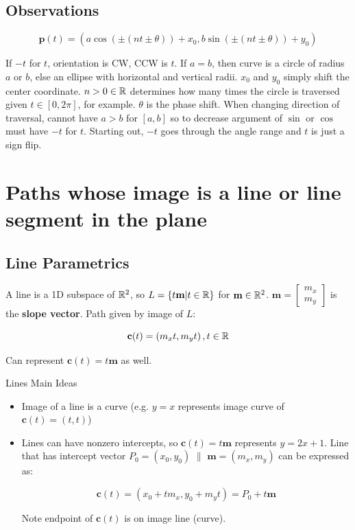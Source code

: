 \subsection{Observations}

\[\boxed{\textbf{p}(t)=(a\cos (\pm (nt \pm\theta)) + x_0, b\sin (\pm (nt \pm \theta)) + y_0)}\]

If $-t$ for $t$, orientation is CW, CCW is $t$. If $a=b$, then curve is 
a circle of radius $a$ or $b$, else an ellipse with horizontal and vertical radii.
$x_0$ and $y_0$ simply shift the center coordinate. $n>0\in \mathbb{R}$ determines how many times
the circle is traversed given $t\in[0,2\pi]$, for example. $\theta$ is the phase shift.
When changing direction of traversal, cannot have $a>b$ for $[a,b]$ so to decrease argument of $\sin$ or $\cos$
must have $-t$ for $t$. Starting out, $-t$ goes through the angle range and $t$ is just a sign flip.

\section{Paths whose image is a line or line segment in the plane}

\subsection{Line Parametrics}

A line is a 1D subspace of $\mathbb{R}^2$, so $L=\{t\textbf{m}|t\in\mathbb{R}\}$ for $\textbf{m}\in\mathbb{R}^2$.
$\textbf{m}=\begin{bmatrix}m_x\\m_y\end{bmatrix}$ is the \textbf{slope vector}.
Path given by image of $L$: 

\[\textbf{c}(t)=\left(m_{x} t, m_{y} t\right),t\in\mathbb{R}\]

Can represent $\textbf{c}(t)=t\textbf{m}$ as well.\newline

\noindent
Lines Main Ideas
\begin{itemize}
    \item Image of a line is a curve (e.g. $y=x$ represents image curve of $\textbf{c}(t)=(t,t)$)
    \item Lines can have nonzero intercepts, so $\textbf{c}(t)=t\textbf{m}$ represents $y=2x+1$. Line
    that has intercept vector $P_0=(x_0,y_0)$ $\parallel$ $\textbf{m}=(m_x,m_y)$ can be expressed as:

    \[\boxed{\textbf{c} (t)=(x_0+tm_x, y_0+m_yt)= \textbf{$P_0$}+t \textbf{m} }\]

    Note endpoint of $\textbf{c}(t)$ is on image line (curve).

\end{itemize}

